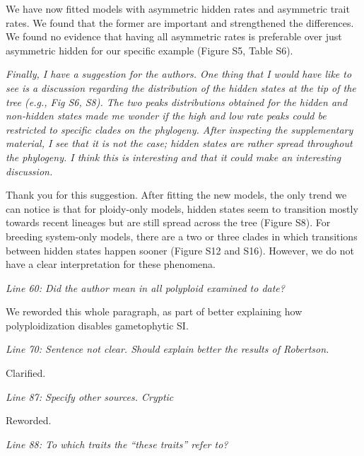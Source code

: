 \documentclass[11pt]{article}
\renewenvironment{quote}{\bigskip\noindent\itshape\ignorespaces}{\smallskip}
\begin{document}
We have now fitted models with asymmetric hidden rates and asymmetric trait rates. We found that the former are important and strengthened the differences. We found no evidence that having all asymmetric rates is preferable over just asymmetric hidden for our specific example (Figure S5, Table S6). 


\begin{quote}
Finally, I have a suggestion for the authors.
One thing that I would have like to see is a discussion regarding the distribution of the hidden states at the tip of the tree (e.g., Fig S6, S8).
The two peaks distributions obtained for the hidden and non-hidden states made me wonder if the high and low rate peaks could be restricted to specific clades on the phylogeny.
After inspecting the supplementary material, I see that it is not the case; hidden states are rather spread throughout the phylogeny.
I think this is interesting and that it could make an interesting discussion.
\end{quote}

Thank you for this suggestion. 
After fitting the new models, the only trend we can notice is that for ploidy-only models, hidden states seem to transition mostly towards recent lineages but are still spread across the tree (Figure S8). 
For breeding system-only models, there are a two or three clades in which transitions between hidden states happen sooner (Figure S12 and S16). 
However, we do not have a clear interpretation for these phenomena.



\begin{quote}
Line 60: Did the author mean in all polyploid examined to date?
\end{quote}

We reworded this whole paragraph, as part of better explaining how polyploidization disables gametophytic SI.


\begin{quote}
Line 70: Sentence not clear. Should explain better the results of Robertson.
\end{quote}

Clarified.


\begin{quote}
Line 87: Specify other sources. Cryptic
\end{quote}

Reworded.


\begin{quote}
Line 88: To which traits the ``these traits'' refer to?
\end{quote}
\end{document}
